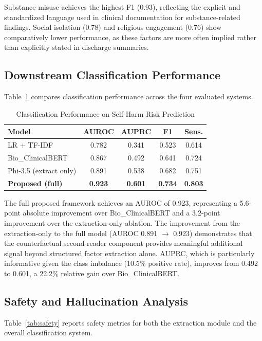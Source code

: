 \documentclass[conference]{IEEEtran}
\begin{document}
Substance misuse achieves the highest F1 (0.93), reflecting the explicit and standardized language used in clinical documentation for substance-related findings. Social isolation (0.78) and religious engagement (0.76) show comparatively lower performance, as these factors are more often implied rather than explicitly stated in discharge summaries.

\subsection{Downstream Classification Performance}

Table~\ref{tab:classification} compares classification performance across the four evaluated systems.

\begin{table}[t]
\caption{Classification Performance on Self-Harm Risk Prediction}
\label{tab:classification}
\centering
\begin{tabular}{lcccc}
\hline
\textbf{Model} & \textbf{AUROC} & \textbf{AUPRC} & \textbf{F1} & \textbf{Sens.} \\
\hline
LR + TF-IDF & 0.782 & 0.341 & 0.523 & 0.614 \\
Bio\_ClinicalBERT & 0.867 & 0.492 & 0.641 & 0.724 \\
Phi-3.5 (extract only) & 0.891 & 0.538 & 0.682 & 0.751 \\
\textbf{Proposed (full)} & \textbf{0.923} & \textbf{0.601} & \textbf{0.734} & \textbf{0.803} \\
\hline
\end{tabular}
\end{table}

The full proposed framework achieves an AUROC of 0.923, representing a 5.6-point absolute improvement over Bio\_ClinicalBERT and a 3.2-point improvement over the extraction-only ablation. The improvement from the extraction-only to the full model (AUROC 0.891 $\rightarrow$ 0.923) demonstrates that the counterfactual second-reader component provides meaningful additional signal beyond structured factor extraction alone. AUPRC, which is particularly informative given the class imbalance (10.5\% positive rate), improves from 0.492 to 0.601, a 22.2\% relative gain over Bio\_ClinicalBERT.

\subsection{Safety and Hallucination Analysis}

Table~\ref{tab:safety} reports safety metrics for both the extraction module and the overall classification system.
\end{document}
